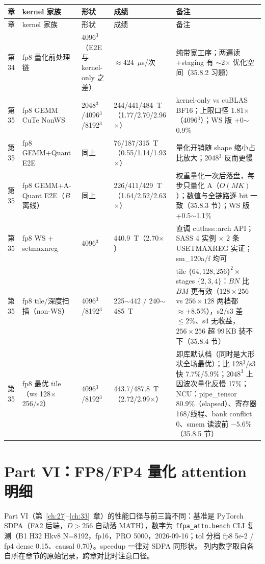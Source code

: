 \begingroup\small
\begin{longtable}{p{1.6cm}p{3.4cm}p{2.4cm}p{3.2cm}p{3.0cm}}
\toprule
章 & kernel 家族 & 形状 & 成绩 & 备注 \\
\midrule
\endfirsthead
\toprule
章 & kernel 家族 & 形状 & 成绩 & 备注 \\
\midrule
\endhead
\endfoot
\bottomrule
\endlastfoot
第34 & fp8 量化前处理链 & $4096^3$（E2E 与 kernel-only 之差） & $\approx$424~$\mu$s/次 & 纯带宽工序；两遍读+staging 有 $\sim$2$\times$ 优化空间（35.8.2 习题） \\
第35 & fp8 GEMM CuTe NonWS & 2048$^3$/4096$^3$/8192$^3$ & 244/441/484~T（1.77/2.70/2.96$\times$） & kernel-only vs cuBLAS BF16；上限口径 1.81$\times$（4096$^3$）；WS 版 +0$\sim$0.9\% \\
第35 & fp8 GEMM+Quant E2E & 同上 & 76/187/315~T（0.55/1.14/1.93$\times$） & 量化开销随 shape 缩小占比放大；2048$^3$ 反而更慢 \\
第35 & fp8 GEMM+A-Quant E2E（$B$ 离线） & 同上 & 226/411/429~T（1.64/2.52/2.63$\times$） & 权重量化一次后落盘，每步只量化 A（$O(MK)$）；数值与全链路逐 bit 一致（35.8.3 节）；WS 版 +0.5$\sim$1.1\% \\
第35 & fp8 WS + setmaxnreg & 4096$^3$ & 440.9~T（2.70$\times$） & 直调 cutlass::arch API；SASS 4 实例 $\times$ 2 条 USETMAXREG 实证；sm\_120a/f 均可 \\
第35 & fp8 tile/深度扫描（non-WS） & 4096$^3$/8192$^3$ & 225$\sim$442 / 240$\sim$485~T & tile $\{64,128,256\}^2\times$ stages $\{2,3,4\}$：$BN$ 比 $BM$ 更有效（$128\times256$ vs $256\times128$ 两档都 $\approx+8.5\%$），s2/s3 差 $\le2\%$、s4 无收益，$256\times256$ 超 99\,KB 装不下（35.8.4 节）\\
第35 & fp8 最优 tile（ws 128$\times$256/s2） & 4096$^3$/8192$^3$ & 443.7/487.8~T（2.72/2.99$\times$） & 即库默认档（同时是大形状全场最优）；比 128$^3$/s3 快 7.7\%/5.9\%；$2048^3$ 上因波次量化反慢 17\%；NCU：pipe\_tensor 80.9\%（elapsed）、寄存器 168/线程、bank conflict 0、smem 读波前 $-5.6\%$（35.8.5 节） \\
\end{longtable}
\endgroup

\section{Part VI：FP8/FP4 量化 attention 明细}

Part VI（第~\ref{ch:27}--\ref{ch:33}~章）的性能口径与前三篇不同：基准是
PyTorch SDPA（FA2 后端，$D>256$ 自动落 MATH），数字为 \texttt{ffpa\_attn.bench}
CLI 复测（B1 H32 Hkv8 N=8192，fp16，PRO 5000，2026-09-16；tol 分档
fp8 5e-2 / fp4 dense 0.15、causal 0.70）。speedup 一律对 SDPA 同形状。
列内数字取自各自所在章节的原始记录，跨章对比时注意口径。

